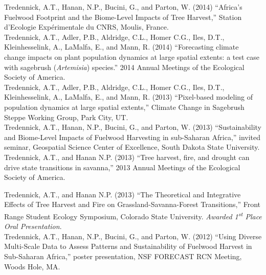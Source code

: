 \documentclass[margin,line]{resume}
\begin{document}
\begin{resume}
    Tredennick, A.T., Hanan, N.P., Bucini, G., and Parton, W. (2014) ``Africa's Fuelwood Footprint and the Biome-Level Impacts of Tree Harvest,'' Station d'Ecologie Exp\'{e}rimentale du CNRS, Moulis, France. \vspace{-6mm}\\%
    
    Tredennick, A.T., Adler, P.B., Aldridge, C.L., Homer C.G., Iles, D.T., Kleinhesselink, A., LaMalfa, E., and Mann, R. (2014) ``Forecasting climate change impacts on plant population dynamics at large spatial extents: a test case with sagebrush (\emph{Artemisia}) species.'' 2014 Annual Meetings of the Ecological Society of America.\vspace{-6mm}\\%
    
    Tredennick, A.T., Adler, P.B., Aldridge, C.L., Homer C.G., Iles, D.T., Kleinhesselink, A., LaMalfa, E., and Mann, R. (2013) ``Pixel-based modeling of population dynamics at large spatial extents,'' Climate Change in Sagebrush Steppe Working Group, Park City, UT. \vspace{-6mm}\\%
    

    Tredennick, A.T., Hanan, N.P., Bucini, G., and Parton, W. (2013) ``Sustainability and Biome-Level Impacts of Fuelwood Harvesting in sub-Saharan Africa,'' invited seminar, Geospatial Science Center of Excellence, South Dakota State University. \vspace{-6mm}\\%
    
    Tredennick, A.T., and Hanan N.P. (2013) ``Tree harvest, fire, and drought can drive state transitions in savanna,'' 2013 Annual Meetings of the Ecological Society of America. \vspace{-6mm}\\%
            \newpage{}    
    
    Tredennick, A.T., and Hanan N.P. (2013) ``The Theoretical and Integrative Effects of Tree Harvest and Fire on Grassland-Savanna-Forest Transitions,'' Front Range Student Ecology Symposium, Colorado State University. \textsl{Awarded 1\textsuperscript{st} Place Oral Presentation}. \vspace{-6mm}\\%
    
    Tredennick, A.T., Hanan, N.P., Bucini, G., and Parton, W. (2012) ``Using Diverse Multi-Scale Data to Assess Patterns and Sustainability of Fuelwood Harvest in Sub-Saharan Africa,'' poster presentation, NSF FORECAST RCN Meeting, Woods Hole, MA. \vspace{-6mm}\\%
    

\end{resume}
\end{document}
